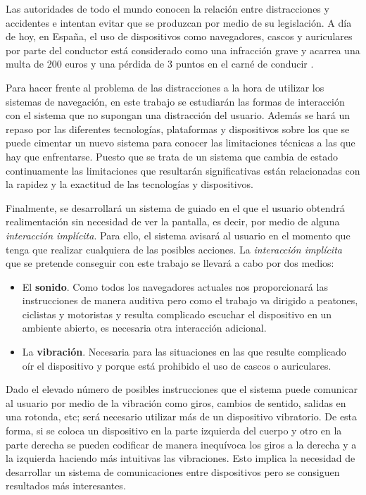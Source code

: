Las autoridades de todo el mundo conocen la relación entre distracciones y accidentes e intentan
evitar que se produzcan por medio de su legislación. A día de hoy, en España, el uso de dispositivos
como navegadores, cascos y auriculares por parte del conductor está considerado como una infracción
grave y acarrea una multa de 200 euros y una pérdida de 3 puntos en el carné de conducir
\cite{Serrano14}.

Para hacer frente al problema de las distracciones a la hora de utilizar los sistemas de navegación,
en este trabajo se estudiarán las formas de interacción con el sistema que no supongan una
distracción del usuario. Además se hará un repaso por las diferentes tecnologías, plataformas y
dispositivos sobre los que se puede cimentar un nuevo sistema para conocer las limitaciones técnicas
a las que hay que enfrentarse. Puesto que se trata de un sistema que cambia de estado continuamente
las limitaciones que resultarán significativas están relacionadas con la rapidez y la exactitud de
las tecnologías y dispositivos.

Finalmente, se desarrollará un sistema de guiado en el que el usuario obtendrá realimentación sin
necesidad de ver la pantalla, es decir, por medio de alguna \emph{interacción implícita}. Para ello,
el sistema avisará al usuario en el momento que tenga que realizar cualquiera de las posibles
acciones. La \emph{interacción implícita} que se pretende conseguir con este trabajo se llevará a
cabo por dos medios:

\begin{itemize}
  \item El \textbf{sonido}. Como todos los navegadores actuales nos proporcionará las instrucciones
    de manera auditiva pero como el trabajo va dirigido a peatones, ciclistas y motoristas y resulta
    complicado escuchar el dispositivo en un ambiente abierto, es necesaria otra interacción
    adicional.
  \item La \textbf{vibración}. Necesaria para las situaciones en las que resulte complicado oír el
    dispositivo y porque está prohibido el uso de cascos o auriculares.
\end{itemize}

Dado el elevado número de posibles instrucciones que el sistema puede comunicar al usuario por medio
de la vibración como giros, cambios de sentido, salidas en una rotonda, etc; será necesario utilizar
más de un dispositivo vibratorio. De esta forma, si se coloca un dispositivo en la parte izquierda
del cuerpo y otro en la parte derecha se pueden codificar de manera inequívoca los giros a la
derecha y a la izquierda haciendo más intuitivas las vibraciones. Esto implica la necesidad de
desarrollar un sistema de comunicaciones entre dispositivos pero se consiguen resultados más
interesantes.

